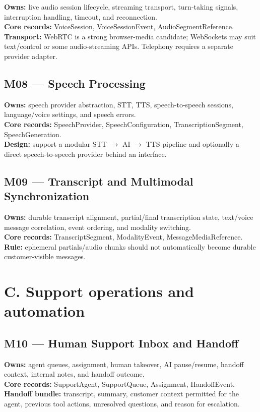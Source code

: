 \textbf{Owns:} live audio session lifecycle, streaming transport, turn-taking signals, interruption handling, timeout, and reconnection. \\ \textbf{Core records:} VoiceSession, VoiceSessionEvent, AudioSegmentReference. \\ \textbf{Transport:} WebRTC is a strong browser-media candidate; WebSockets may suit text/control or some audio-streaming APIs. Telephony requires a separate provider adapter.

\subsection{M08 --- Speech Processing}

\textbf{Owns:} speech provider abstraction, STT, TTS, speech-to-speech sessions, language/voice settings, and speech errors. \\ \textbf{Core records:} SpeechProvider, SpeechConfiguration, TranscriptionSegment, SpeechGeneration. \\ \textbf{Design:} support a modular STT \ensuremath{\rightarrow} AI \ensuremath{\rightarrow} TTS pipeline and optionally a direct speech-to-speech provider behind an interface.

\subsection{M09 --- Transcript and Multimodal Synchronization}

\textbf{Owns:} durable transcript alignment, partial/final transcription state, text/voice message correlation, event ordering, and modality switching. \\ \textbf{Core records:} TranscriptSegment, ModalityEvent, MessageMediaReference. \\ \textbf{Rule:} ephemeral partials/audio chunks should not automatically become durable customer-visible messages.

\section{C. Support operations and automation}

\subsection{M10 --- Human Support Inbox and Handoff}

\textbf{Owns:} agent queues, assignment, human takeover, AI pause/resume, handoff context, internal notes, and handoff outcome. \\ \textbf{Core records:} SupportAgent, SupportQueue, Assignment, HandoffEvent. \\ \textbf{Handoff bundle:} transcript, summary, customer context permitted for the agent, previous tool actions, unresolved questions, and reason for escalation.

